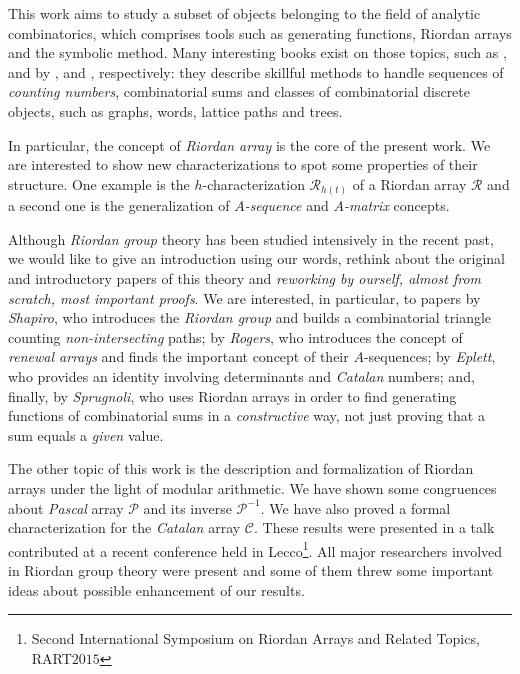 
This work aims to study
a subset of objects belonging to the field of analytic combinatorics, which
comprises tools such as generating functions, Riordan arrays and the symbolic
method. Many interesting books exist on those topics, such as
\cite{Flajolet:2009:AC:1506267}, \cite{Knuth:1998:ACP:521463} and
\cite{Graham:1994:CMF:562056} by \citeauthor{Flajolet:2009:AC:1506267},
\citeauthor{Knuth:1998:ACP:521463} and \citeauthor{Graham:1994:CMF:562056},
respectively: they describe skillful methods to handle sequences of
\emph{counting numbers}, combinatorial sums and classes of combinatorial
discrete objects, such as graphs, words, lattice paths and trees. 

In particular, the concept of \emph{Riordan array} is the core of the present
work.  We are interested to show new characterizations to spot some properties
of their structure. One example is the $h$-characterization
$\mathcal{R}_{h(t)}$ of a Riordan array $\mathcal{R}$ and a second one is the
generalization of \textit{$A$-sequence} %
and
\textit{$A$-matrix} %
concepts.

Although \emph{Riordan group} theory has been studied intensively in the recent past, we would
like to give an introduction using our words, rethink about the original and
introductory papers of this theory and \emph{reworking by ourself, almost from scratch,
most important proofs}.  We are interested, in particular, to papers by
\emph{Shapiro}, who introduces the \emph{Riordan group} and builds a
combinatorial triangle counting \emph{non-intersecting} paths; by
\emph{Rogers}, who introduces the concept of \emph{renewal arrays} and finds
the important concept of their $A$-sequences; by \emph{Eplett}, who provides an
identity involving determinants and \emph{Catalan} numbers; and, finally, by
\emph{Sprugnoli}, who uses Riordan arrays in order to find generating functions
of combinatorial sums in a \emph{constructive} way, not just proving that a sum
equals a \emph{given} value.%

 The other topic of
this work is the description and formalization of Riordan arrays under the
light of modular arithmetic. We have shown some congruences about \emph{Pascal}
array $\mathcal{P}$ and its inverse $\mathcal{P}^{-1}$. We have also proved a
formal characterization for the \emph{Catalan} array $\mathcal{C}$. These
results were presented in a talk contributed at a recent conference held in
Lecco\footnote{Second International Symposium on Riordan Arrays and Related
Topics, RART$2015$}. All major researchers involved in Riordan group theory
were present and some of them threw some important ideas about possible
enhancement of our results.  

